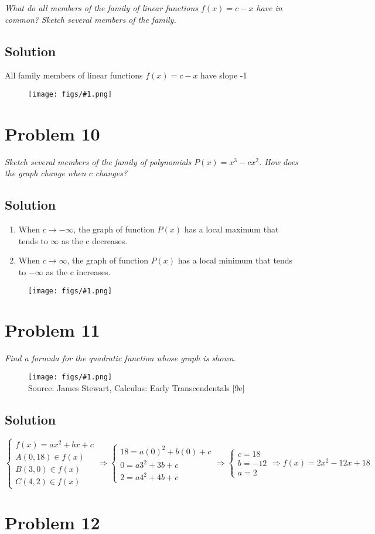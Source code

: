 \documentclass[11pt]{article}
\newcommand{\soln}{\subsection*}
\newcommand{\qn}{\textit}
\newcommand{\imagesource}[1]{{\footnotesize Source: #1}}
\newcommand{\imgqn}[1]{
	\begin{figure}[H]
		\centering
		\texttt{[image: figs/\#1.png]}\\
		\imagesource{James Stewart, Calculus: Early Transcendentals [9e]}
	\end{figure}
}
\newcommand{\imgsoln}[1]{
	\begin{figure}[H]
		\centering
		\texttt{[image: figs/\#1.png]}
	\end{figure}
}
\begin{document}
\qn{What do all members of the family of linear functions $f(x)=c-x$ have in common? Sketch several members of the family.}

\soln{Solution}
All family members of linear functions $f(x)=c-x$ have slope -1
\imgsoln{1.2.9-ans}

\section*{Problem 10}

\qn{Sketch several members of the family of polynomials $P(x)=x^3-cx^2$. How does the graph change when $c$ changes?}

\soln{Solution}
\begin{enumerate}
	\item When $c \to -\infty$, the graph of function $P(x)$ has a local maximum that tends to $\infty$ as the c decreases.
	\item When $c \to \infty$, the graph of function $P(x)$ has a local minimum that tends to $-\infty$ as the c increases.
\end{enumerate}
\imgsoln{1.2.10-ans}

\section*{Problem 11}

\qn{Find a formula for the quadratic function whose graph is shown.}

\imgqn{1.2.11}

\soln{Solution}
\begin{equation*}
	\begin{cases}
		f(x)=ax^2+bx+c \\
		A(0,18) \in f(x) \\
		B(3,0) \in f(x) \\
		C(4,2) \in f(x)
	\end{cases}
	\Rightarrow
	\begin{cases}
		18=a(0)^2+b(0)+c \\
		0=a3^2+3b+c \\
		2=a4^2+4b+c
	\end{cases}
	\Rightarrow
	\begin{cases}
		c=18 \\
		b=-12 \\
		a=2
	\end{cases}
	\Rightarrow
	f(x)=2x^2-12x+18
\end{equation*}

\section*{Problem 12}
\end{document}
